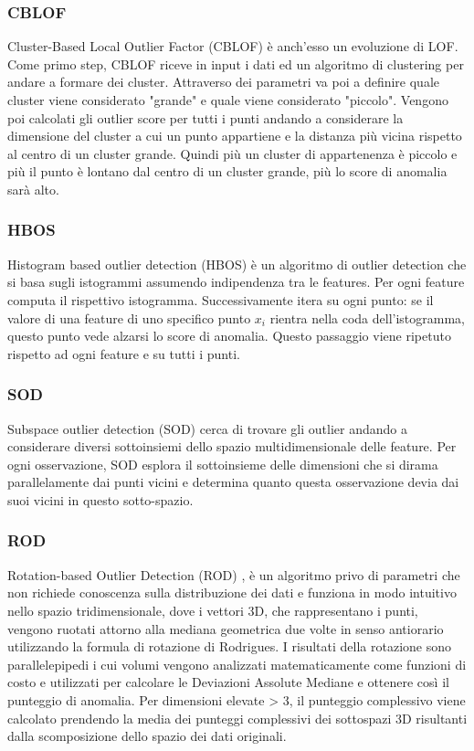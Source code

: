 \subsubsection{CBLOF}
Cluster-Based Local Outlier Factor (CBLOF) \cite{he2003discovering} è anch'esso un evoluzione di LOF.
Come primo step, CBLOF riceve in input i dati ed un algoritmo di clustering per andare a formare dei cluster. Attraverso dei parametri va poi a definire quale cluster viene considerato "grande" e quale viene considerato "piccolo". Vengono poi calcolati gli outlier score per tutti i punti andando a considerare la dimensione del cluster a cui un punto appartiene e la distanza più vicina rispetto al centro di un cluster grande. Quindi più un cluster di appartenenza è piccolo e più il punto è lontano dal centro di un cluster grande, più lo score di anomalia sarà alto. 

\subsubsection{HBOS}
Histogram based outlier detection (HBOS) \cite{goldstein2012histogram} è un algoritmo di outlier detection che si basa sugli istogrammi assumendo indipendenza tra le features. Per ogni feature computa il rispettivo istogramma. Successivamente itera su ogni punto: se il valore di una feature di uno specifico punto $x_i$ rientra nella coda dell'istogramma, questo punto vede alzarsi lo score di anomalia. Questo passaggio viene ripetuto rispetto ad ogni feature e su tutti i punti.

\subsubsection{SOD}
Subspace outlier detection (SOD) \cite{kriegel2009outlier} cerca di trovare gli outlier andando a considerare diversi sottoinsiemi dello spazio multidimensionale delle feature. Per ogni osservazione, SOD esplora il sottoinsieme delle dimensioni che si dirama parallelamente dai punti vicini e determina quanto questa osservazione devia dai suoi vicini in questo sotto-spazio. 

\subsubsection{ROD}
Rotation-based Outlier Detection (ROD) \cite{almardeny2020novel},  è un algoritmo privo di parametri che non richiede conoscenza sulla distribuzione dei dati e funziona in modo intuitivo nello spazio tridimensionale, dove i vettori 3D, che rappresentano i punti, vengono ruotati attorno alla mediana geometrica due volte in senso antiorario utilizzando la formula di rotazione di Rodrigues. I risultati della rotazione sono parallelepipedi i cui volumi vengono analizzati matematicamente come funzioni di costo e utilizzati per calcolare le Deviazioni Assolute Mediane e ottenere così il punteggio di anomalia. Per dimensioni elevate > 3, il punteggio complessivo viene calcolato prendendo la media dei punteggi complessivi dei sottospazi 3D risultanti dalla scomposizione dello spazio dei dati originali.


